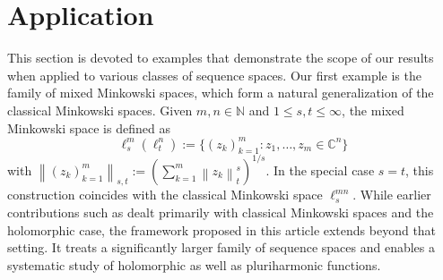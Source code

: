 \documentclass[a4paper,11pt, reqno]{amsart}
\theoremstyle{definition}
\newcommand{\norm}[1]{\left\lVert#1\right\rVert}
\begin{document}
	\section{Application}
	This section is devoted to examples that demonstrate the scope of our results when applied to various classes of sequence spaces. Our first example is the family of mixed Minkowski spaces, which form a natural generalization of the classical Minkowski spaces. Given $m,n \in \mathbb{N}$ and $1 \leq s,t \leq \infty$, the mixed Minkowski space is defined as 
	$$\ell^m_s(\ell^n_t):=\{(z_{k})^m_{k=1}:z_{1}, \ldots,z_{m} \in \mathbb{C}^n\}$$ 
	with $\norm{(z_{k})^m_{k=1}}_{s,t}:=(\sum_{k=1}^{m}\norm{z_{k}}^s_t)^{1/s}$. In the special case $s=t$, this construction coincides with the classical Minkowski space $\ell^{mn}_s$. While earlier contributions such as \cite{Allu-Pal-arithnmetic,A-H-P-banach} dealt primarily with classical Minkowski spaces and the holomorphic case, the framework proposed in this article extends beyond that setting. It treats a significantly larger family of sequence spaces and enables a systematic study of holomorphic as well as pluriharmonic functions.
\end{document}
